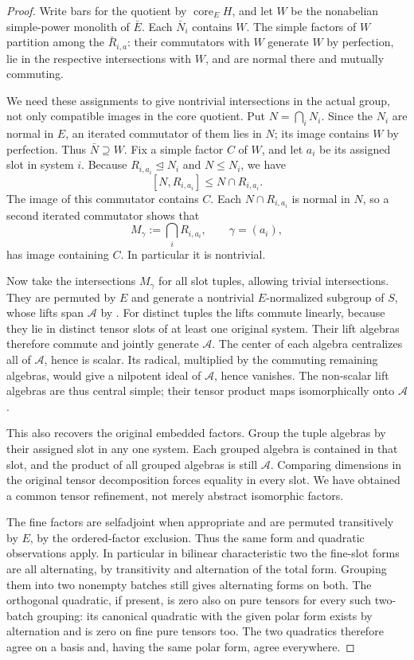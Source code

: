 \begin{proof}
Write bars for the quotient by $\operatorname{core}_E H$, and let $W$
be the nonabelian simple-power monolith of $\bar E$. Each $\bar N_i$
contains $W$. The simple factors of $W$ partition among the
$\bar R_{i,a}$: their commutators with $W$ generate $W$ by perfection,
lie in the respective intersections with $W$, and are normal there and
mutually commuting.

We need these assignments to give nontrivial intersections in the actual
group, not only compatible images in the core quotient. Put
$N=\bigcap_iN_i$. Since the $N_i$ are normal in $E$, an iterated
commutator of them lies in $N$; its image contains $W$ by perfection.
Thus $\bar N\supseteq W$. Fix a simple factor $C$ of $W$, and let $a_i$
be its assigned slot in system $i$. Because $R_{i,a_i}\trianglelefteq N_i$
and $N\le N_i$, we have
\[
 [N,R_{i,a_i}]\le N\cap R_{i,a_i}.
\]
The image of this commutator contains $C$. Each $N\cap R_{i,a_i}$ is
normal in $N$, so a second iterated commutator shows that
\[
 M_\gamma:=\bigcap_iR_{i,a_i},\qquad \gamma=(a_i),
\]
has image containing $C$. In particular it is nontrivial.

Now take the intersections $M_\gamma$ for all slot tuples, allowing
trivial intersections. They are permuted by $E$ and generate a
nontrivial $E$-normalized subgroup of $S$, whose lifts span
$\mathcal A$ by . For distinct tuples the lifts
commute linearly, because they lie in distinct tensor slots of at least
one original system. Their lift algebras therefore commute and jointly
generate $\mathcal A$. The center of each algebra centralizes all of
$\mathcal A$, hence is scalar. Its radical, multiplied by the commuting
remaining algebras, would give a nilpotent ideal of $\mathcal A$, hence
vanishes. The non-scalar lift algebras are thus central simple; their
tensor product maps isomorphically onto $\mathcal A$.

This also recovers the original embedded factors. Group the tuple
algebras by their assigned slot in any one system. Each grouped algebra
is contained in that slot, and the product of all grouped algebras is
still $\mathcal A$. Comparing dimensions in the original tensor
decomposition forces equality in every slot. We have obtained a common
tensor refinement, not merely abstract isomorphic factors.

The fine factors are selfadjoint when appropriate and are permuted
transitively by $E$, by the ordered-factor exclusion. Thus the same form
and quadratic observations apply. In particular in bilinear
characteristic two the fine-slot forms are all alternating, by
transitivity and alternation of the total form. Grouping them into two
nonempty batches still gives alternating forms on both. The orthogonal
quadratic, if present, is zero also on pure tensors for every such
two-batch grouping: its canonical quadratic with the given polar form
exists by alternation and is zero on fine pure tensors too. The two
quadratics therefore agree on a basis and, having the same polar form,
agree everywhere.
\end{proof}

